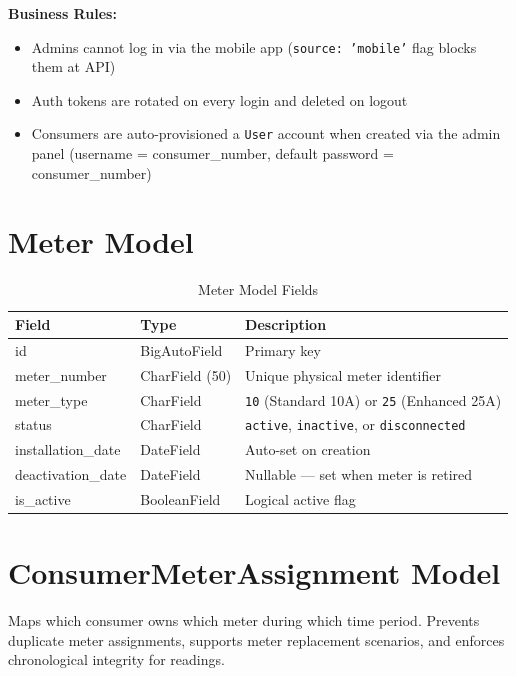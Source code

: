 \documentclass[12pt, a4paper]{report}
\newenvironment{featurelist}{%
    \begin{itemize}[leftmargin=1.5em, itemsep=2pt, parsep=0pt]
}{%
    \end{itemize}
}
\begin{document}
\textbf{Business Rules:}
\begin{featurelist}
    \item Admins cannot log in via the mobile app (\texttt{source: 'mobile'} flag blocks them at API)
    \item Auth tokens are rotated on every login and deleted on logout
    \item Consumers are auto-provisioned a \texttt{User} account when created via the admin panel (username = consumer\_number, default password = consumer\_number)
\end{featurelist}

\section{Meter Model}

\begin{table}[H]
\centering
\caption{Meter Model Fields}
\begin{tabularx}{\textwidth}{>{\ttfamily}l l X}
\toprule
\textbf{Field} & \textbf{Type} & \textbf{Description} \\
\midrule
id & BigAutoField & Primary key \\
meter\_number & CharField (50) & Unique physical meter identifier \\
meter\_type & CharField & \texttt{10} (Standard 10A) or \texttt{25} (Enhanced 25A) \\
status & CharField & \texttt{active}, \texttt{inactive}, or \texttt{disconnected} \\
installation\_date & DateField & Auto-set on creation \\
deactivation\_date & DateField & Nullable — set when meter is retired \\
is\_active & BooleanField & Logical active flag \\
\bottomrule
\end{tabularx}
\end{table}

\section{ConsumerMeterAssignment Model}

Maps which consumer owns which meter during which time period. Prevents duplicate meter assignments, supports meter replacement scenarios, and enforces chronological integrity for readings.
\end{document}
